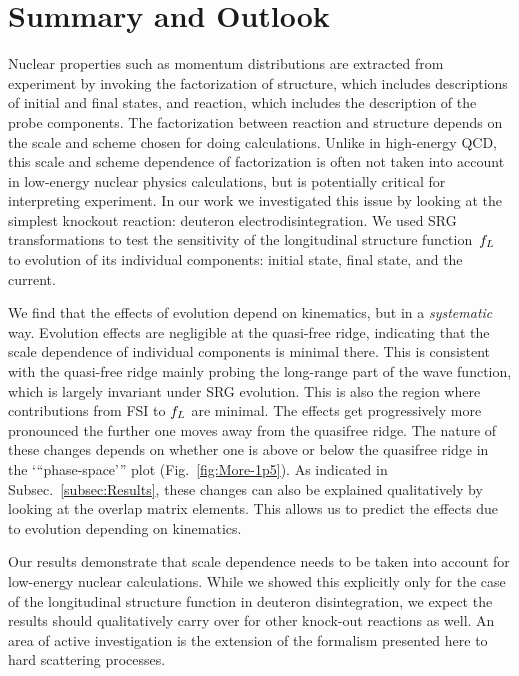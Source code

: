 	\section{Summary and Outlook}

	Nuclear properties such as momentum distributions are extracted from
	experiment by invoking the factorization of structure, which includes
	descriptions of	initial and final states, and reaction, which includes the
	description of the probe components.
	The factorization between reaction and structure depends on the scale and
	scheme chosen for doing calculations.  Unlike in high-energy QCD, this scale
	and scheme dependence of factorization is often not taken into account in
	low-energy nuclear physics calculations, but is potentially critical for
	interpreting experiment.
	In our work we investigated this issue by looking at the simplest knockout
	reaction: deuteron electrodisintegration.  We used SRG transformations to test
	the sensitivity of the longitudinal structure function~$f_L$ to evolution of
	its	individual components: initial state, final state, and the current.

	We find that the effects of evolution depend on kinematics,
	but in a \emph{systematic} way.  Evolution effects are negligible at the
	quasi-free ridge,	indicating that the
	scale dependence of individual components is minimal there.  This is
	consistent with the quasi-free ridge mainly probing the long-range part of
	the	wave function, which is largely invariant under SRG evolution.  This is
	also the region where contributions from FSI to $f_L$ are minimal.
	The effects get progressively more pronounced the further one moves away from
	the quasifree ridge.  The nature of these changes depends on whether one
	is above or below the quasifree ridge in the ‘“phase-space’” plot
	(Fig.~\ref{fig:More-1p5}).
	As indicated in Subsec.~\ref{subsec:Results}, these changes can also be
	explained qualitatively
	by looking at the overlap matrix elements.  This allows us to predict the
	effects due to evolution depending on kinematics.

	Our results demonstrate that scale dependence needs to be taken into account
	for low-energy nuclear calculations.  While we showed this explicitly only
	for	the case of the longitudinal structure function in deuteron
	disintegration,	we expect the results should qualitatively
	carry over for other knock-out reactions as well.
	An area of active investigation is the extension of the formalism presented
	here to hard scattering processes.


